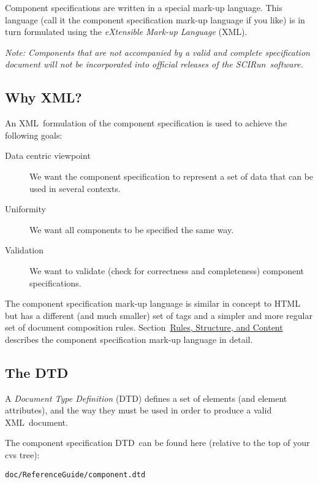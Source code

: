 \documentclass{article}
\newcommand{\acronym}[1]{#1}
\newcommand{\dfn}[1]{\emph{#1}}
\newcommand{\xml}{\acronym{XML}}
\newcommand{\dtd}{\acronym{DTD}}
\newcommand{\sr}{\acronym{SCIRun}}
\newcommand{\sectitle}[1]{\emph{#1}}
\newcommand{\sechyperref}[1]{\hyperref{\sectitle{#1}}{}{}{#1}}
\newcommand{\Note}[1]{\emph{Note: #1}}
\newcommand{\SUBSECwhyXml}{Why XML?}
\newcommand{\SUBSECwhatDtd}{The DTD}
\newcommand{\SECcontent}{Rules, Structure, and Content}
\begin{document}
Component specifications are written in a special mark-up language.  This
language (call it the component specification mark-up language if you
like) is in turn formulated using the \dfn{eXtensible Mark-up Language}
(\xml).

\Note{Components that are not accompanied by a valid and complete
  specification document will not be incorporated into official
  releases of the \sr\ software.}

\subsection{\SUBSECwhyXml}
\label{\SUBSECwhyXml}

An \xml\ formulation of the component specification is used to achieve
the following goals:

\begin{description}
\item[Data centric viewpoint] We want the component specification to represent
  a set of data that can be used in several contexts.

\item[Uniformity] We want all components to be specified the same way.

\item[Validation] We want to validate (check for correctness and
  completeness) component specifications.
\end{description}

The component specification mark-up language is similar in concept to HTML but
has a different (and much smaller) set of tags and a simpler and more
regular set of document composition rules.
Section~\sechyperref{\SECcontent} describes
the component specification mark-up language in detail.

\subsection{\SUBSECwhatDtd}
\label{\SUBSECwhatDtd}

A \dfn{Document Type Definition} (\dtd) defines a set of elements (and
element attributes), and the way they must be used in order to produce a
valid \xml\ document.

The component specification \dtd\ can be found here (relative to the top
of your cvs tree):

\begin{verbatim}
doc/ReferenceGuide/component.dtd
\end{verbatim}
\end{document}
